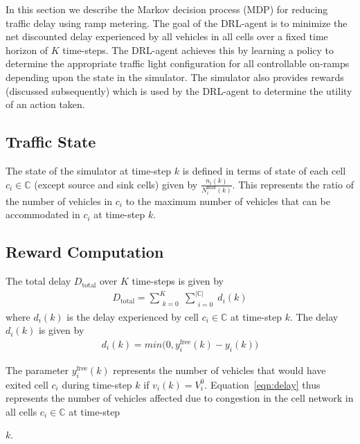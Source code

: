 \documentclass[conference]{IEEEtran}
\begin{document}
In this section we describe the Markov decision process (MDP) for reducing traffic delay using ramp metering. The goal of the DRL-agent is to  minimize the net discounted delay experienced by all vehicles in all cells over a fixed time horizon of $K$ time-steps. The DRL-agent achieves this by learning a policy to determine the appropriate traffic light configuration for all controllable on-ramps depending upon the state in the simulator. The simulator also provides rewards (discussed subsequently) which is used by the DRL-agent to determine the utility of an action taken.

\subsection{Traffic State}
The state of the simulator at time-step $k$ is defined in terms of state of each cell $c_i\in \mathbb{C}$ (except source and sink cells) given by $\frac{n_i(k)}{N_i^{\text{max}}(k)}$. This represents the ratio of the number of
vehicles in $c_i$ to the maximum number of vehicles that can be accommodated in $c_i$ at time-step $k$.
\subsection{Reward Computation}
The total delay $D_{\text{total}}$ over $K$ time-steps is given by
\begin{align}
D_{\text{total}}=\sum\limits_{\substack{k=0}}^{K}\sum\limits_{\substack{i=0}}^{|\mathbb{C}|}d_i(k)
\end{align}
where $d_i(k)$ is the delay experienced by cell $c_{i} \in \mathbb{C}$ at time-step $k$. The delay $d_i(k)$ is given by
\begin{align}
\label{eqn:delay}
d_i(k)=min\Big(0,y_i^{\text{free}}(k)-y_i(k)\Big)
\end{align}

The parameter $y_i^{\text{free}}(k)$ represents the number of vehicles that would have exited cell $c_i$ during time-step $k$ if $v_i(k)=V^0_i$. Equation~\ref{eqn:delay} thus represents the number of vehicles affected due to congestion in the cell network in all cells $c_i\in \mathbb{C}$ at time-step


 $k$.
\end{document}
